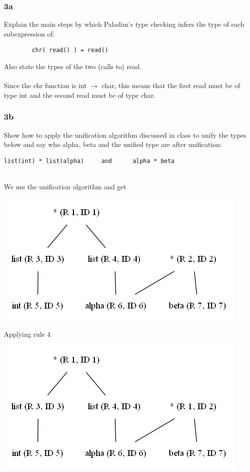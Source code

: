 \documentclass[12pt]{article}
\begin{document}
\subsubsection*{3a}
Explain the main steps by which Paladim's type checking infers the type of each subexpression of:
\begin{verbatim}
        chr( read() ) = read()
\end{verbatim}
Also state the types of the two (calls to) read.\\
\\
Since the chr function is int $\rightarrow$ char, this means that the first read must be of type int and the second read must be of type char.

\subsubsection*{3b}
Show how to apply the unification algorithm discussed in class to unify the types below and say who alpha, beta and the unified type are after unification:
\begin{verbatim}
list(int) * list(alpha)     and      alpha * beta
\end{verbatim}
$ $\\
We use the unification algorithm and get\\
\begin{center}
\includegraphics[scale=0.6]{graph1}
\end{center}
\newpage
Applying rule 4
\begin{center}
\includegraphics[scale=0.6]{graph2}
\end{center}
\end{document}
